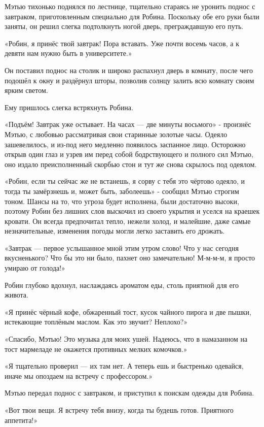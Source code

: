 \documentclass[a5paper, 9pt,
final, openany, twoside=true]{memoir}
\begin{document}
Мэтью тихонько поднялся по лестнице, тщательно стараясь не уронить поднос с завтраком, приготовленным специально для Робина. Поскольку обе его руки были заняты, он решил слегка подтолкнуть ногой дверь, преграждавшую его путь.

«Робин, я принёс твой завтрак! Пора вставать. Уже почти восемь часов, а к девяти нам нужно быть в университете.»

Он поставил поднос на столик и широко распахнул дверь в комнату, после чего подошёл к окну и раздёрнул шторы, позволив солнцу залить всю комнату своим ярким светом.

Ему пришлось слегка встряхнуть Робина.

«Подъём! Завтрак уже остывает. На часах — две минуты восьмого» - произнёс Мэтью, с любовью рассматривая свои старинные золотые часы. Одеяло зашевелилось, и из-под него медленно появилось заспанное лицо. Осторожно открыв один глаз и узрев им перед собой бодрствующего и полного сил Мэтью, оно издало преисполненный скорбью стон и тут же снова скрылось под одеялом.

«Робин, если ты сейчас же не встанешь, я сорву с тебя это чёртово одеяло, и тогда ты замёрзнешь и, может быть, заболеешь» - сообщил Мэтью строгим тоном. Шансы на то, что угроза будет исполнена, были достаточно высоки, поэтому Робин без лишних слов выскочил из своего укрытия и уселся на краешек кровати. Он всегда предпочитал тепло, нежели холод, и малейшие, даже самые незначительные, изменения погоды могли легко заставить его дрожать.

«Завтрак — первое услышанное мной этим утром слово! Что у нас сегодня вкусненького? Что бы это ни было, пахнет оно замечательно! М-м-м-м, я просто умираю от голода!»

Робин глубоко вдохнул, наслаждаясь ароматом еды, столь приятной для его живота.

«Я принёс чёрный кофе, обжаренный тост, кусок чайного пирога и две пышки, истекающие топлёным маслом. Как это звучит? Неплохо?»

«Спасибо, Мэтью! Это музыка для моих ушей. Надеюсь, что в намазанном на тост мармеладе не окажется противных мелких комочков.»

«Я тщательно проверил — их там нет. А теперь ешь и быстренько одевайся, иначе мы опоздаем на встречу с профессором.»

Мэтью передал поднос с завтраком, и приступил к поискам одежды для Робина.

«Вот твои вещи. Я встречу тебя внизу, когда ты будешь готов. Приятного аппетита!»
\end{document}
